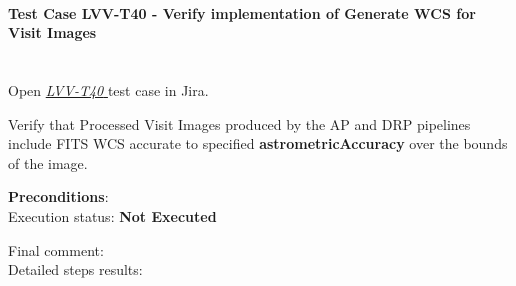 \documentclass[DM,lsstdraft,STR,toc]{lsstdoc}
\begin{document}
\paragraph{Test Case LVV-T40 -  Verify implementation of Generate WCS for Visit Images
 }\mbox{}\\

Open  \href{https://jira.lsstcorp.org/secure/Tests.jspa#/testCase/LVV-T40}{\textit{ LVV-T40 } }
test case in Jira.

 Verify that Processed Visit Images produced by the AP and DRP pipelines
include FITS WCS accurate to specified \textbf{astrometricAccuracy} over
the bounds of the image.


\textbf{ Preconditions}:\\


Execution status: {\bf Not Executed }

Final comment:\\


Detailed steps results:
\end{document}
